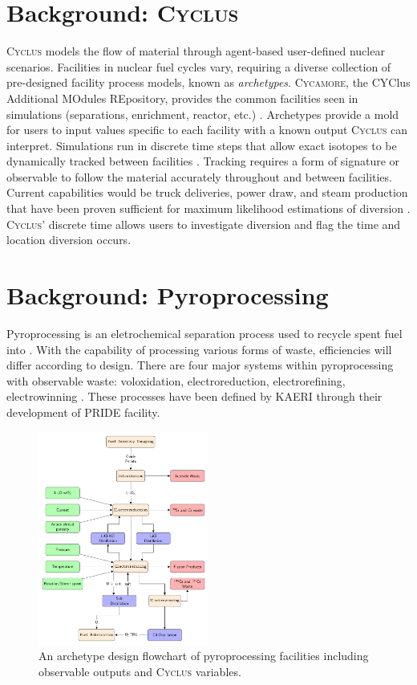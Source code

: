\documentclass{anstrans}
\newcommand{\Cyclus}{\textsc{Cyclus}\xspace}%
\newcommand{\Cycamore}{\textsc{Cycamore}\xspace}%
\begin{document}
\section{Background: \Cyclus}
\Cyclus models the flow of material through agent-based user-defined nuclear 
scenarios. Facilities in nuclear fuel cycles vary, requiring a diverse 
collection of pre-designed facility process models, known as \emph{archetypes}. 
\Cycamore, the CYClus Additional MOdules REpository, provides the common 
facilities seen in simulations (separations, enrichment, reactor, etc.) 
\cite{huff_extensions_2014}. Archetypes provide a mold for users to input 
values specific to each facility with a known output \Cyclus can interpret. 
Simulations run in discrete time steps that allow exact isotopes to be 
dynamically tracked between facilities \cite{huff_fundamental_2016}. Tracking 
requires a form of signature or observable to follow the material accurately 
throughout and between facilities. Current capabilities would be truck 
deliveries, power draw, and steam production that have been proven sufficient 
for maximum likelihood estimations of diversion \cite{Hou_2016,Yilmaz_2016}.  
\Cyclus' discrete time allows users to investigate diversion and flag the time 
and location diversion occurs.

\section{Background: Pyroprocessing}
Pyroprocessing is an eletrochemical separation process used to recycle spent 
fuel into . With the capability of processing various forms of waste, 
efficiencies will differ according to design. There are four major systems 
within pyroprocessing with observable waste: voloxidation, electroreduction, 
electrorefining, electrowinning \cite{Borrelli_2017}. These processes have been 
defined by \gls{KAERI} through their development of \gls{PRIDE} facility. 

\begin{figure}[ht] %
	\centering
	\includegraphics[width=0.5\textwidth]{flowchart}
	\caption{An archetype design flowchart of pyroprocessing facilities including observable outputs and \Cyclus variables.}
	\label{fig:flowchart}
\end{figure}
\end{document}
